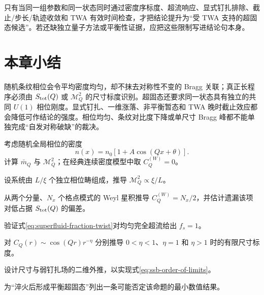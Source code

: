 \begin{chaptercheck}
只有当同一组参数和同一状态同时通过密度序标度、超流响应、显式钉扎排除、截止/步长/轨迹收敛和 TWA 有效时间检查，才把结论提升为“受 TWA 支持的超固态候选”。若还缺独立量子方法或平衡性证据，应把这些限制写进结论句本身。
\end{chaptercheck}

\section*{本章小结}

随机条纹相位会令平均密度均匀，却不抹去对称性不变的 Bragg 关联；真正长程序必须由 $S_{\rm tot}(Q)$ 或 $\mathcal M_Q^2$ 的尺寸标度识别。超固态还要求同一状态具有独立的共同 $U(1)$ 相位刚度。显式钉扎、一维涨落、非平衡暂态和 TWA 晚时截止效应都会降低可作结论的强度。相位均匀、条纹对比度下降或单尺寸 Bragg 峰都不能单独完成“自发对称破缺”的裁决。

\begin{exercises}
  \item 考虑随机全局相位的密度
  \[
    n(x)=n_0[1+A\cos(Qx+\theta)].
  \]
  计算 $\bar m_Q$ 与 $\mathcal M_Q^2$；在经典连续密度模型中取 $C_Q^{(W)}=0$。
  \item 设系统由 $L/\xi$ 个独立相位畴组成，推导 $\mathcal M_Q^2\propto\xi/L$。
  \item 从两个分量、$N_x$ 个格点模式的 Weyl 星积推导 $C_Q^{(W)}=N_x/2$，并估计遗漏该项对低占据 $S_{\rm tot}(Q)$ 的偏差。
  \item 验证式\eqref{eq:superfluid-fraction-twist}对均匀完全超流给出 $f_s=1$。
  \item 对 $C_Q(r)\sim\cos(Qr)r^{-\eta}$ 分别推导 $0<\eta<1$、$\eta=1$ 和 $\eta>1$ 时的有限尺寸标度。
  \item 设计尺寸与弱钉扎场的二维外推，以实现式\eqref{eq:ssb-order-of-limits}。
  \item 为“淬火后形成平衡超固态”列出一条可能否定该命题的最小数值结果。
\end{exercises}
